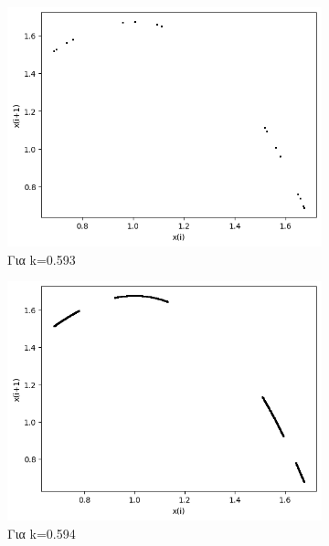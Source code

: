 \begin{figure}[h!]
\centering
	\begin{subfigure}[b]{0.4\textwidth}
		\centering
		\includegraphics[width=\textwidth]{LateX images/graphs q07/g8}
		\caption{Για k=0.593}
		\label{f:k42}
	\end{subfigure}
	\hfill
	\begin{subfigure}[b]{0.4\textwidth}
		\centering
		\includegraphics[width=\textwidth]{LateX images/graphs q07/g9}
		\caption{Για k=0.594}
		\label{f:k43}
	\end{subfigure}
	\hfill
	\begin{subfigure}[b]{0.4\textwidth}
		\centering

\end{subfigure}
\end{figure}
